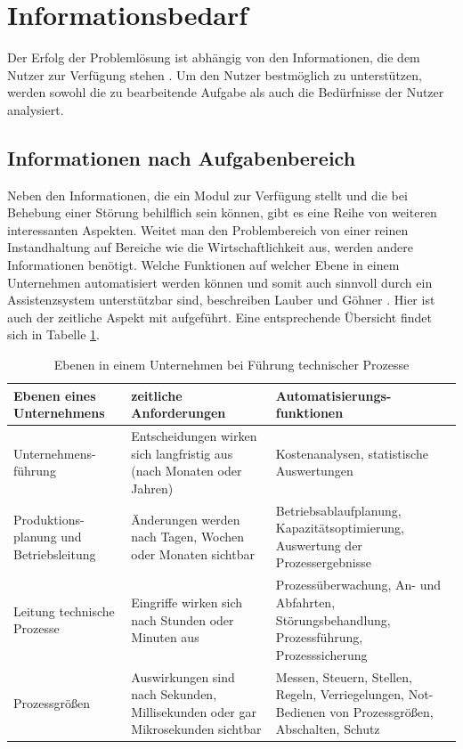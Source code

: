 \section{Informationsbedarf}
Der Erfolg der Problemlösung ist abhängig von den Informationen, die dem Nutzer zur Verfügung stehen \cite{Funke2015}. Um den Nutzer bestmöglich zu unterstützen, werden sowohl die zu bearbeitende Aufgabe als auch die Bedürfnisse der Nutzer analysiert.

\subsection{Informationen nach Aufgabenbereich}
Neben den Informationen, die ein Modul zur Verfügung stellt und die bei Behebung einer Störung behilflich sein können, gibt es eine Reihe von weiteren interessanten Aspekten. Weitet man den Problembereich von einer reinen Instandhaltung auf Bereiche wie die Wirtschaftlichkeit aus, werden andere Informationen benötigt. Welche Funktionen auf welcher Ebene in einem Unternehmen automatisiert werden können und somit auch sinnvoll durch ein Assistenzsystem unterstützbar sind, beschreiben Lauber und Göhner \cite{Lauber1999}. Hier ist auch der zeitliche Aspekt mit aufgeführt. Eine entsprechende Übersicht findet sich in Tabelle \ref{tab:Ebenen-Unternehmen}.
\begin{table}[htb]
\centering
\caption[Ebenen in einem Unternehmen bei Führung technischer Prozesse]{Ebenen in einem Unternehmen bei Führung technischer Prozesse \citep{Lauber1999}}
\label{tab:Ebenen-Unternehmen}
\begin{tabular}{|p{}|p{}|p{}|}
\hline
\textbf{Ebenen eines Unternehmens} & \textbf{zeitliche Anforderungen} & \textbf{Automatisierungs-funktionen} \\
\hline
Unternehmens-führung & Entscheidungen wirken sich langfristig aus (nach Monaten oder Jahren) & Kostenanalysen, statistische Auswertungen \\
\hline
Produktions-planung und Betriebsleitung & Änderungen werden nach Tagen, Wochen oder Monaten sichtbar & Betriebsablaufplanung, Kapazitätsoptimierung, Auswertung der Prozessergebnisse \\
\hline
Leitung technische Prozesse & Eingriffe wirken sich nach Stunden oder Minuten aus & Prozessüberwachung, An- und Abfahrten, Störungsbehandlung, Prozessführung, Prozesssicherung \\
\hline
Prozessgrößen & Auswirkungen sind nach Sekunden, Millisekunden oder gar Mikrosekunden sichtbar & Messen, Steuern, Stellen, Regeln, Verriegelungen, Not-Bedienen von Prozessgrößen, Abschalten, Schutz \\
\hline
\end{tabular}
\end{table}

